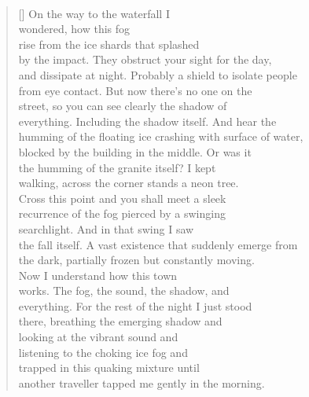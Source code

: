 \documentclass{book}
\begin{document}
\newpage
\poemtitle{\textcolor[RGB]{165,15,15}{Waterfall}}
\hspace*{\fill} \\
\settowidth{\versewidth}{and dissipate at night. Probably a shield to isolate people}
\begin{verse}[\versewidth]
    On the way to the waterfall I\\
    wondered, how this fog \\
    rise from the ice shards that splashed \\
    by the impact. They obstruct your sight for the day, \\
    and dissipate at night. Probably a shield to isolate people\\
    from eye contact. But now there's no one on the \\
    street, so you can see clearly the shadow of\\
    everything. Including the shadow itself. And hear the \\
    humming of the floating ice crashing with surface of water, \\
    blocked by the building in the middle. Or was it\\
    the humming of the granite itself? I kept\\
    walking, across the corner stands a neon tree.\\
    Cross this point and you shall meet a sleek\\
    recurrence of the fog pierced by a swinging \\
    searchlight. And in that swing I saw\\
    the fall itself. A vast existence that suddenly emerge from \\
    the dark, partially frozen but constantly moving.\\
    Now I understand how this town\\
    works. The fog, the sound, the shadow, and\\
    everything. For the rest of the night I just stood \\
    there, breathing the emerging shadow and\\
    looking at the vibrant sound and\\
    listening to the choking ice fog and\\
    trapped in this quaking mixture until\\
    another traveller tapped me gently in the morning.\\
\end{verse}
\end{document}
